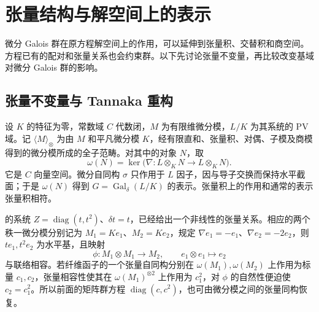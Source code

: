 %
%
\section{张量结构与解空间上的表示}
\label{b5:sec:E04}

微分 Galois 群在原方程解空间上的作用，可以延伸到张量积、交替积和商空间。方程已有的配对和张量关系也会约束群。以下先讨论张量不变量，再比较改变基域对微分 Galois 群的影响。

\subsection{张量不变量与 Tannaka 重构}
\label{b5:subsec:E04:01}

设 \(K\) 的特征为零，常数域 \(C\) 代数闭，\(M\) 为有限维微分模，\(L/K\) 为其系统的 PV 域。记 \(\langle M\rangle_\otimes\) 为由 \(M\) 和平凡微分模 \(K\)，经有限直和、张量积、对偶、子模及商模得到的微分模所成的全子范畴。对其中的对象 \(N\)，取
\[
	\omega(N)=\ker\bigl(\nabla:L\otimes_KN\longrightarrow L\otimes_KN\bigr).
\]
它是 \(C\) 向量空间。微分自同构 \(\sigma\) 只作用于 \(L\) 因子，因与导子交换而保持水平截面；于是 \(\omega(N)\) 得到 \(G=\operatorname{Gal}_\delta(L/K)\) 的表示。张量积上的作用和通常的表示张量积相符。

\ProseParagraphBreak
{}的系统 \(Z=\operatorname{diag}(t,t^2)\)、\(\delta t=t\)，已经给出一个非线性的张量关系。相应的两个秩一微分模分别记为 \(M_1=Ke_1\)、\(M_2=Ke_2\)，规定 \(\nabla e_1=-e_1\)、\(\nabla e_2=-2e_2\)，则 \(te_1,t^2e_2\) 为水平基，且映射
\[
	\phi:M_1\otimes M_1\longrightarrow M_2,\qquad e_1\otimes e_1\longmapsto e_2
\]
与联络相容。若纤维函子的一个张量自同构分别在 \(\omega(M_1),\omega(M_2)\) 上作用为标量 \(c_1,c_2\)，张量相容性使其在 \(\omega(M_1)^{\otimes2}\) 上作用为 \(c_1^2\)，对 \(\phi\) 的自然性便迫使 \(c_2=c_1^2\)。所以前面的矩阵群方程 \(\operatorname{diag}(c,c^2)\)，也可由微分模之间的张量同构恢复。

